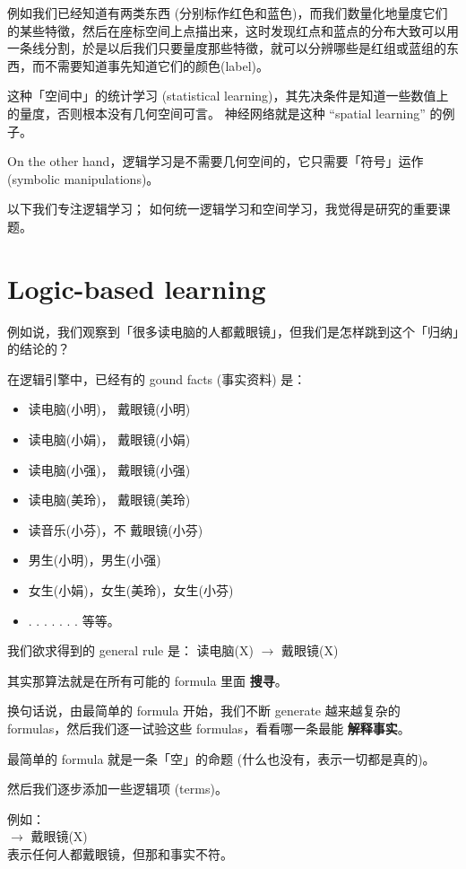 \documentclass[orivec]{llncs}
\newcommand{\tab}{\hspace*{1cm}}
\begin{document}
例如我们已经知道有两类东西 (分别标作{\color{red}红色}和{\color{blue}蓝色})，而我们数量化地量度它们的某些特徵，然后在座标空间上点描出来，这时发现{\color{red}红点}和{\color{blue}蓝点}的分布大致可以用一条线分割，於是以后我们只要量度那些特徵，就可以分辨哪些是{\color{red}红组}或{\color{blue}蓝组}的东西，而不需要知道事先知道它们的颜色(label)。

这种「空间中」的统计学习 (statistical learning)，其先决条件是知道一些数值上的量度，否则根本没有几何空间可言。  神经网络就是这种 ``spatial learning'' 的例子。

On the other hand，逻辑学习是不需要几何空间的，它只需要「符号」运作 (symbolic manipulations)。 

以下我们专注逻辑学习；  如何统一逻辑学习和空间学习，我觉得是研究的重要课题。

\section{Logic-based learning}

例如说，我们观察到「很多读电脑的人都戴眼镜」，但我们是怎样跳到这个「归纳」的结论的？

在逻辑引擎中，已经有的 gound facts (事实资料) 是：
\begin{itemize}
\item 读电脑(小明)， 戴眼镜(小明)
\item 读电脑(小娟)， 戴眼镜(小娟)
\item 读电脑(小强)， 戴眼镜(小强)
\item 读电脑(美玲)， 戴眼镜(美玲)
\item 读音乐(小芬)，不 戴眼镜(小芬)
\item 男生(小明)，男生(小强)
\item 女生(小娟)，女生(美玲)，女生(小芬)
\item . . . . . . . 等等。
\end{itemize}
我们欲求得到的 general rule 是：
读电脑(X) $\rightarrow$ 戴眼镜(X)

其实那算法就是在所有可能的 formula 里面 \textbf{搜寻}。

换句话说，由最简单的 formula 开始，我们不断 generate 越来越复杂的 formulas，然后我们逐一试验这些 formulas，看看哪一条最能 \textbf{解释事实}。

最简单的 formula 就是一条「空」的命题 (什么也没有，表示一切都是真的)。

然后我们逐步添加一些逻辑项 (terms)。

例如：\\
\tab $\rightarrow$ 戴眼镜(X) \\
表示任何人都戴眼镜，但那和事实不符。
\end{document}
